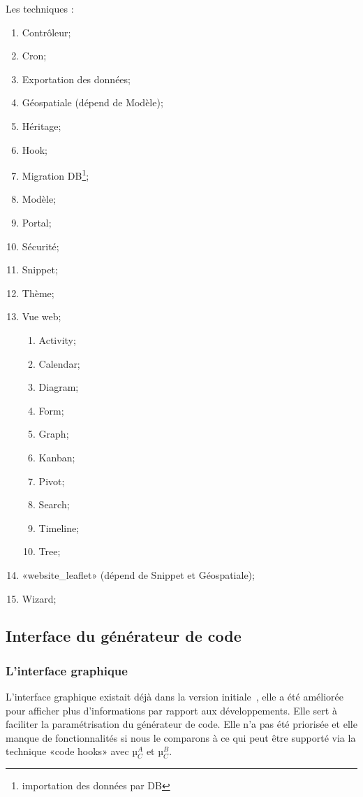 Les techniques :
\begin{enumerate}
    \item Contrôleur;
    \item Cron;
    \item Exportation des données;
    \item Géospatiale (dépend de Modèle);
    \item Héritage;
    \item Hook;
    \item Migration DB\footnote{importation des données par DB};
    \item Modèle;
    \item Portal;
    \item Sécurité;
    \item Snippet;
    \item Thème;
    \item Vue web;
    \begin{enumerate}
        \item Activity;
        \item Calendar;
        \item Diagram;
        \item Form;
        \item Graph;
        \item Kanban;
        \item Pivot;
        \item Search;
        \item Timeline;
        \item Tree;
    \end{enumerate}
    \item «website\_leaflet» (dépend de Snippet et Géospatiale);
    \item Wizard;
\end{enumerate}

\subsection{Interface du générateur de code}

\subsubsection{L'interface graphique}

 L'interface graphique existait déjà dans la version initiale~\cite{bluiksnot_repo}, elle a été améliorée pour afficher plus d'informations par rapport aux développements. Elle sert à faciliter la paramétrisation du générateur de code. Elle n’a pas été priorisée et elle manque de fonctionnalités si nous le comparons à ce qui peut être supporté via la technique «code hooks» avec µ$_C^A$ et µ$_C^B$.

